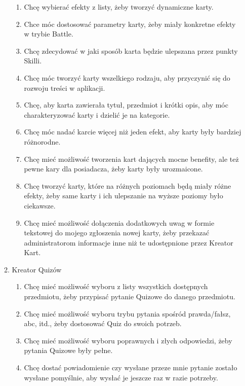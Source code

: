 \documentclass{article}
\begin{document}
\begin{tcolorbox}
\begin{enumerate}
\begin{enumerate}
\begin{enumerate}
                            \item Chcę wybierać efekty z listy, żeby tworzyć dynamiczne karty.
                            \item Chce móc dostosować parametry karty, żeby miały konkretne efekty w trybie Battle.
                            \item Chcę zdecydować w jaki sposób karta będzie ulepszana przez punkty Skilli.
                            \item Chcę móc tworzyć karty wszelkiego rodzaju, aby przyczynić się do rozwoju treści w aplikacji.
                            \item Chcę, aby karta zawierała tytuł, przedmiot i krótki opis, aby móc charakteryzować karty i dzielić je na kategorie.
                            \item Chcę móc nadać karcie więcej niż jeden efekt, aby karty były bardziej różnorodne.
                            \item Chcę mieć możliwość tworzenia kart dających mocne benefity, ale też pewne kary dla posiadacza, żeby karty były urozmaicone.
                            \item Chcę tworzyć karty, które na różnych poziomach będą miały różne efekty, żeby same karty i ich ulepszanie na wyższe poziomy było ciekawsze.
                            \item Chcę mieć możliwość dołączenia dodatkowych uwag w formie tekstowej do mojego zgłoszenia nowej karty, żeby przekazać administratorom informacje inne niż te udostępnione przez Kreator Kart.
                        \end{enumerate}
                  \item Kreator Quizów
                        \begin{enumerate}
                            \item Chcę mieć możliwość wyboru z listy wszystkich dostępnych przedmiotu, żeby przypisać pytanie Quizowe do danego przedmiotu.
                            \item Chcę mieć możliwość wyboru trybu pytania spośród prawda/fałsz, abc, itd., żeby dostosować Quiz do swoich potrzeb.
                            \item Chcę mieć możliwość wyboru poprawnych i złych odpowiedzi, żeby pytania Quizowe były pełne.
                            \item Chcę dostać powiadomienie czy wysłane przeze mnie pytanie zostało wysłane pomyślnie, aby wysłać je jeszcze raz w razie potrzeby.

\end{enumerate}
\end{enumerate}
\end{enumerate}
\end{tcolorbox}
\end{document}
